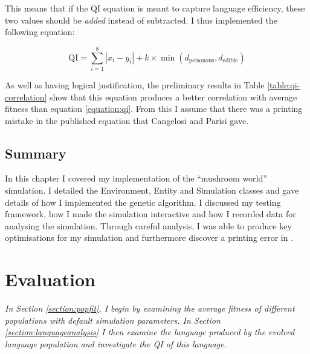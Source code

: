 \documentclass[12pt,a4paper]{report}
\begin{document}
This means that if the QI equation is meant to capture language efficiency, these two values should be \emph{added} instead of subtracted. I thus implemented the following equation:

\begin{equation}
\label{equation:qibetter}
\mathrm{QI} = \sum^{8}_{i = 1} |x_i - y_i| + k \times \min (d_{\mathrm{poisonous}}, d_{\mathrm{edible}})
\end{equation}

As well as having logical justification, the preliminary results in Table \ref{table:qi-correlation} show that this equation produces a better correlation with average fitness than equation \ref{equation:qi}. From this I assume that there was a printing mistake in the published equation that Cangelosi and Parisi gave. 

\section{Summary}

In this chapter I covered my implementation of the ``mushroom world'' simulation. I detailed the Environment, Entity and Simulation classes and gave details of how I implemented the genetic algorithm. I discussed my testing framework, how I made the simulation interactive and how I recorded data for analysing the simulation. Through careful analysis, I was able to produce key optimisations for my simulation and furthermore discover a printing error in \citet{Cangelosi1998}.


\chapter{Evaluation}

\emph{In Section \ref{section:popfit}, I begin by examining the average fitness of different populations with default simulation parameters. In Section \ref{section:languageanalysis} I then examine the language produced by the evolved language population and investigate the QI of this language. }
\end{document}
